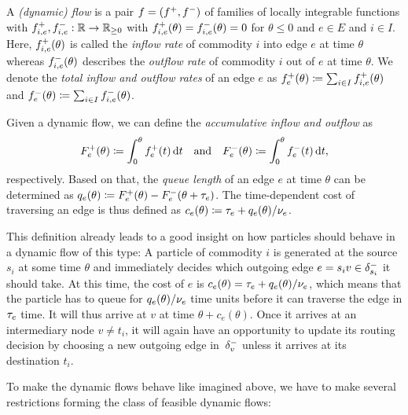\begin{definition}
    A \emph{(dynamic) flow} is a pair $f = ({f}^+, {f}^-)$ of families of locally integrable functions with ${f}^+_{i,e}, {f}^-_{i,e} : \mathbb{R} \rightarrow \mathbb{R}_{\geq 0}$ with ${f}^+_{i,e}(\theta) = {f}^-_{i,e}(\theta) = 0$ for $\theta \leq 0$ and  $e\in E$ and $i\in I$.
    Here, ${f}^+_{i,e}(\theta)$ is called the \emph{inflow rate} of commodity $i$ into edge $e$ at time $\theta$ whereas ${f}^-_{i,e}(\theta)$ describes the \emph{outflow rate} of commodity $i$ out of $e$ at time $\theta$.
    We denote the \emph{total inflow and outflow rates} of an edge $e$ as ${f}^+_e(\theta) \coloneqq \sum_{i\in I} {f}^+_{i,e}(\theta)$ and ${f}^-_e(\theta) \coloneqq \sum_{i\in I}{f}^-_{i,e}(\theta)$.

    Given a dynamic flow, we can define the \emph{accumulative inflow and outflow} as
    \[
        F^+_e(\theta) \coloneqq \int_0^\theta {f}^+_e(t) \,\textnormal{d} t \quad\text{and}\quad  F^-_e(\theta) \coloneqq \int_0^\theta {f}^-_e(t) \,\textnormal{d} t,
    \]
    respectively.
    Based on that, the \emph{queue length} of an edge $e$ at time $\theta$ can be determined as $q_e(\theta) \coloneqq F^+_e(\theta) - F^-_e(\theta + \tau_e)$.
    The time-dependent cost of traversing an edge is thus defined as $c_e(\theta) \coloneqq \tau_e + q_e(\theta) / \nu_e$.
\end{definition}

This definition already leads to a good insight on how particles should behave in a dynamic flow of this type:
A particle of commodity $i$ is generated at the source $s_i$ at some time $\theta$ and immediately decides which outgoing edge $e=s_i v\in \delta^-_{s_i}$ it should take.
At this time, the cost of $e$ is $c_e(\theta) = \tau_e + q_e(\theta) / \nu_e$, which means that the particle has to queue for $q_e(\theta) / \nu_e$ time units before it can traverse the edge in $\tau_e$ time.
It will thus arrive at $v$ at time $\theta + c_e(\theta)$.
Once it arrives at an intermediary node $v\neq t_i$, it will again have an opportunity to update its routing decision by choosing a new outgoing edge in~$\delta^-_{v}$ unless it arrives at its destination $t_i$. 

To make the dynamic flows behave like imagined above, we have to make several restrictions forming the class of feasible dynamic flows:

